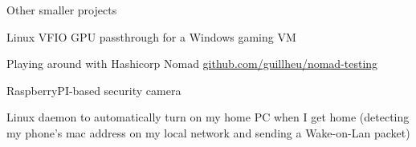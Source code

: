 \begin{cventries}
  \cventry
    {} %
    {Other smaller projects} %
    {} %
    {} %
    {
      \begin{cvitems} %
        \item {Linux VFIO GPU passthrough for a Windows gaming VM}
        \item {Playing around with Hashicorp Nomad \href{https://github.com/guillheu/nomad-testing}{github.com/guillheu/nomad-testing}}
        \item {RaspberryPI-based security camera}
        \item {Linux daemon to automatically turn on my home PC when I get home (detecting my phone's mac address on my local network and sending a Wake-on-Lan packet)}
      \end{cvitems}
    }

\end{cventries}
